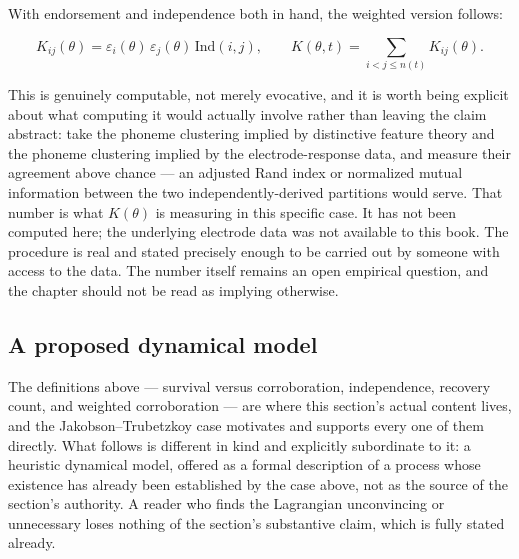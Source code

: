 With endorsement and independence both in hand, the weighted version follows:

\begin{definition}
\[
K_{ij}(\theta) = \varepsilon_i(\theta)\,\varepsilon_j(\theta)\,\mathrm{Ind}(i,j), \qquad K(\theta,t) = \sum_{i<j \le n(t)} K_{ij}(\theta).
\]
\end{definition}

This is genuinely computable, not merely evocative, and it is worth being explicit about what computing it would actually involve rather than leaving the claim abstract: take the phoneme clustering implied by distinctive feature theory and the phoneme clustering implied by the electrode-response data, and measure their agreement above chance --- an adjusted Rand index or normalized mutual information between the two independently-derived partitions would serve. That number is what $K(\theta)$ is measuring in this specific case. It has not been computed here; the underlying electrode data was not available to this book. The procedure is real and stated precisely enough to be carried out by someone with access to the data. The number itself remains an open empirical question, and the chapter should not be read as implying otherwise.

\subsection{A proposed dynamical model}

The definitions above --- survival versus corroboration, independence, recovery count, and weighted corroboration --- are where this section's actual content lives, and the Jakobson--Trubetzkoy case motivates and supports every one of them directly. What follows is different in kind and explicitly subordinate to it: a heuristic dynamical model, offered as a formal description of a process whose existence has already been established by the case above, not as the source of the section's authority. A reader who finds the Lagrangian unconvincing or unnecessary loses nothing of the section's substantive claim, which is fully stated already.

